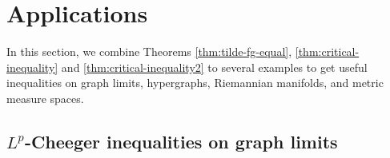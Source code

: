 \documentclass[12pt,a4paper]{article}
\begin{document}
\section{Applications}
\label{sec:Applications}
In this section, we combine Theorems \ref{thm:tilde-fg-equal}, \ref{thm:critical-inequality} and \ref{thm:critical-inequality2} to several examples to get useful inequalities on graph limits, hypergraphs, Riemannian manifolds, and metric measure spaces.
\subsection{$L^p$-Cheeger inequalities on graph limits}\label{subsec:Cheeger-monotonicity}
\end{document}
